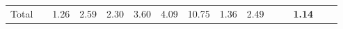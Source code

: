 \begin{tabular}{ll|rrrrrr|rrrrrrr}
  \hline
  Total  & &



  


  
  1.26 & 2.59 & 2.30 & 3.60 & 4.09 & 10.75 & 1.36 & 2.49 &  &  & \textbf{1.14} \\


\end{tabular}
